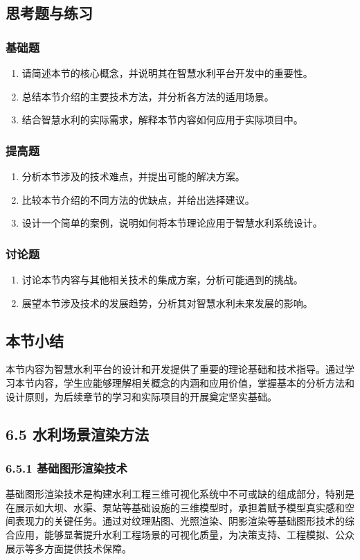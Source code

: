 {\subsection{思考题与练习}\label{ux601dux8003ux9898ux4e0eux7ec3ux4e60-5} \subsubsection{基础题}\label{ux57faux7840ux9898-5}
\begin{enumerate} \def\labelenumi{\arabic{enumi}.} \tightlist \item 请简述本节的核心概念，并说明其在智慧水利平台开发中的重要性。 \item
总结本节介绍的主要技术方法，并分析各方法的适用场景。 \item 结合智慧水利的实际需求，解释本节内容如何应用于实际项目中。 \end{enumerate}
\subsubsection{提高题}\label{ux63d0ux9ad8ux9898-5} \begin{enumerate} \def\labelenumi{\arabic{enumi}.} \tightlist \item
分析本节涉及的技术难点，并提出可能的解决方案。 \item 比较本节介绍的不同方法的优缺点，并给出选择建议。 \item 设计一个简单的案例，说明如何将本节理论应用于智慧水利系统设计。 \end{enumerate}
\subsubsection{讨论题}\label{ux8ba8ux8bbaux9898-5} \begin{enumerate} \def\labelenumi{\arabic{enumi}.} \tightlist \item
讨论本节内容与其他相关技术的集成方案，分析可能遇到的挑战。 \item 展望本节涉及技术的发展趋势，分析其对智慧水利未来发展的影响。 \end{enumerate}
\subsection{本节小结}\label{ux672cux8282ux5c0fux7ed3-4}
本节内容为智慧水利平台的设计和开发提供了重要的理论基础和技术指导。通过学习本节内容，学生应能够理解相关概念的内涵和应用价值，掌握基本的分析方法和设计原则，为后续章节的学习和实际项目的开展奠定坚实基础。 \subsection{6.5
水利场景渲染方法}\label{ux6c34ux5229ux573aux666fux6e32ux67d3ux65b9ux6cd5} \subsubsection{6.5.1
基础图形渲染技术}\label{ux57faux7840ux56feux5f62ux6e32ux67d3ux6280ux672f}
基础图形渲染技术是构建水利工程三维可视化系统中不可或缺的组成部分，特别是在展示如大坝、水渠、泵站等基础设施的三维模型时，承担着赋予模型真实感和空间表现力的关键任务。通过对纹理贴图、光照渲染、阴影渲染等基础图形技术的综合应用，能够显著提升水利工程场景的可视化质量，为决策支持、工程模拟、公众展示等多方面提供技术保障。
}
